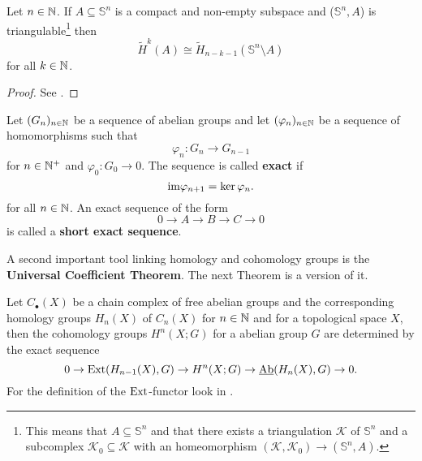 \begin{thm}\label{thm:alex}
  Let $n \in \mathbb{N}$. If $A \subseteq \mathbb{S}^n$ is a compact and non-empty subspace and ($\mathbb{S}^n, A$) is triangulable\footnote{This means that $A \subseteq \mathbb{S}^n$ and that there exists a triangulation $\mathcal{K}$ of $\mathbb{S}^n$ and a subcomplex $\mathcal{K}_0 \subseteq \mathcal{K}$ with an homeomorphism $(\mathcal{K}, \mathcal{K}_0) \to (\mathbb{S}^n, A)$.} then
  \begin{equation*}
    \tilde{H}^k(A) \cong \tilde{H}_{n-k-1}(\mathbb{S}^n \setminus A)
  \end{equation*}
  for all $k \in \mathbb{N}$.
\end{thm}

\begin{proof}
  See \cite[Theorem 71.1]{MunAlTop}.
\end{proof}

\begin{defin}
  Let $(G_n)_{n\in\mathbb{N}}$ be a sequence of abelian groups and let $(\varphi_n)_{n\in\mathbb{N}}$ be a sequence of homomorphisms such that
  \begin{equation*}
    \varphi_n\colon G_n \to G_{n-1}
  \end{equation*}
  for $n \in \mathbb{N}^+$ and $\varphi_0\colon G_0 \to 0$.
  The sequence is called \textbf{exact} if
  \begin{equation*}
    {\rm im}\varphi_{n+1} = \ker\varphi_n.
  \end{equation*}
  for all $n \in \mathbb{N}$.
  An exact sequence of the form
  \begin{equation*}
    0 \to A \to B \to C \to 0
  \end{equation*}
  is called a \textbf{short exact sequence}.
\end{defin}

A second important tool linking homology and cohomology groups is the \textbf{Universal Coefficient Theorem}. The next Theorem is a version of it.

\begin{thm}\label{thm:uct}
Let $C_\bullet(X)$ be a chain complex of free abelian groups and the corresponding homology groups $H_n(X)$ of $C_n(X)$ for $n \in \mathbb{N}$ and for a topological space $X$, then the cohomology groups $H^n(X; G)$ for a abelian group $G$ are determined by the exact sequence
  \begin{equation*}
    0 \to {\rm Ext}(H_{n-1}(X), G) \to H^n(X; G) \to \underline{\rm Ab}(H_n(X), G) \to 0.
  \end{equation*}
  For the definition of the ${\rm Ext}$-functor look in \cite[p. 195]{hatcher}.
\end{thm}

